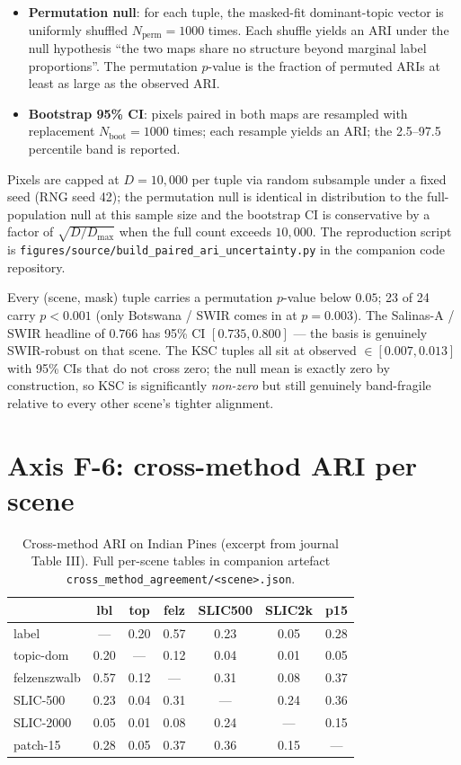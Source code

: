 \documentclass[11pt,a4paper]{article}
\begin{document}
\begin{itemize}
\item \textbf{Permutation null}: for each tuple, the masked-fit
dominant-topic vector is uniformly shuffled $N_{\text{perm}} = 1000$
times. Each shuffle yields an ARI under the null hypothesis ``the two
maps share no structure beyond marginal label proportions''. The
permutation $p$-value is the fraction of permuted ARIs at least as
large as the observed ARI.
\item \textbf{Bootstrap 95\% CI}: pixels paired in both maps are
resampled with replacement $N_{\text{boot}} = 1000$ times; each
resample yields an ARI; the 2.5--97.5 percentile band is reported.
\end{itemize}

Pixels are capped at $D = 10{,}000$ per tuple via random subsample
under a fixed seed (RNG seed 42); the permutation null is identical
in distribution to the full-population null at this sample size and
the bootstrap CI is conservative by a factor of $\sqrt{D / D_{\max}}$
when the full count exceeds $10{,}000$. The reproduction script is
\texttt{figures/source/build\_paired\_ari\_uncertainty.py} in the
companion code repository.



Every (scene, mask) tuple carries a permutation $p$-value below
$0.05$; 23 of 24 carry $p < 0.001$ (only Botswana / SWIR comes in at
$p = 0.003$). The Salinas-A / SWIR headline of $0.766$ has
95\% CI $[0.735, 0.800]$ --- the basis is genuinely
SWIR-robust on that scene. The KSC tuples all sit at observed
$\in [0.007, 0.013]$ with 95\% CIs that do not cross zero; the
null mean is exactly zero by construction, so KSC is significantly
\emph{non-zero} but still genuinely band-fragile relative to every
other scene's tighter alignment.

\section{Axis F-6: cross-method ARI per scene}

\begin{table}[h]
\caption{Cross-method ARI on Indian Pines (excerpt from journal Table
III). Full per-scene tables in companion artefact
\texttt{cross\_method\_agreement/<scene>.json}.}
\label{tab:b6-ip}
\centering
\small
\begin{tabular}{l c c c c c c}
\toprule
              & lbl & top  & felz  & SLIC500 & SLIC2k & p15 \\
\midrule
label         & ---  & 0.20 & 0.57 & 0.23 & 0.05 & 0.28 \\
topic-dom     & 0.20 & ---  & 0.12 & 0.04 & 0.01 & 0.05 \\
felzenszwalb  & 0.57 & 0.12 & ---  & 0.31 & 0.08 & 0.37 \\
SLIC-500      & 0.23 & 0.04 & 0.31 & ---  & 0.24 & 0.36 \\
SLIC-2000     & 0.05 & 0.01 & 0.08 & 0.24 & ---  & 0.15 \\
patch-15      & 0.28 & 0.05 & 0.37 & 0.36 & 0.15 & ---  \\
\bottomrule
\end{tabular}
\end{table}
\end{document}
